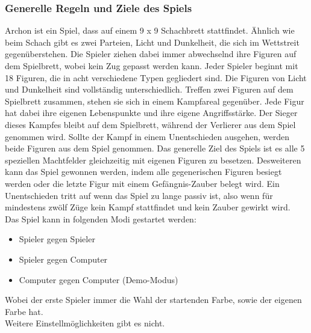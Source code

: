 \subsubsection{Generelle Regeln und Ziele des Spiels}
Archon ist ein Spiel, dass auf einem 9 x 9 Schachbrett stattfindet. Ähnlich wie beim Schach gibt es zwei Parteien, Licht und Dunkelheit, die sich im Wettstreit gegenüberstehen.
Die Spieler ziehen dabei immer abwechselnd ihre Figuren auf dem Spielbrett, wobei kein Zug gepasst werden kann. Jeder Spieler beginnt mit 18 Figuren, die in acht verschiedene Typen gegliedert sind. Die Figuren von Licht und Dunkelheit sind vollständig unterschiedlich. Treffen zwei Figuren auf dem Spielbrett zusammen, stehen sie sich in einem Kampfareal gegenüber. Jede Figur hat dabei ihre eigenen Lebenspunkte und ihre eigene Angriffsstärke. Der Sieger dieses Kampfes bleibt auf dem Spielbrett, während der Verlierer aus dem Spiel genommen wird. Sollte der Kampf in einem Unentschieden ausgehen, werden beide Figuren aus dem Spiel genommen.
\clearpage
\noindent Das generelle Ziel des Spiels ist es alle 5 speziellen Machtfelder gleichzeitig mit eigenen Figuren zu besetzen.
Desweiteren kann das Spiel gewonnen werden, indem alle gegenerischen Figuren besiegt werden oder die letzte Figur mit einem Gefängnis-Zauber belegt wird.
Ein Unentschieden tritt auf wenn das Spiel zu lange passiv ist, also wenn für mindestens zwölf Züge kein Kampf stattfindet und kein Zauber gewirkt wird.\\
Das Spiel kann in folgenden Modi gestartet werden: 
\begin{itemize}
	\item Spieler gegen Spieler
	\item Spieler gegen Computer
	\item Computer gegen Computer (Demo-Modus)
\end{itemize}
Wobei der erste Spieler immer die Wahl der startenden Farbe, sowie der eigenen Farbe hat.\\Weitere Einstellmöglichkeiten gibt es nicht.

